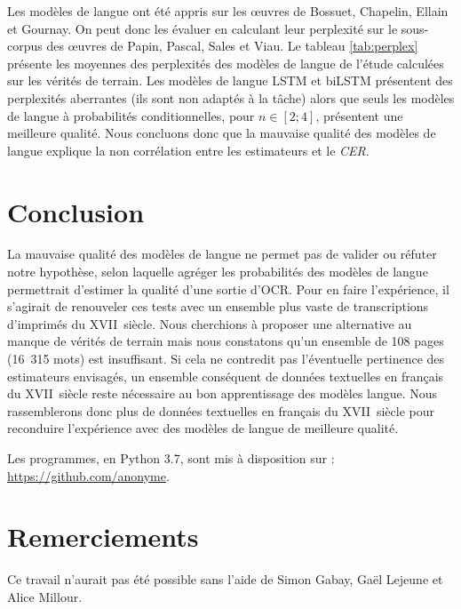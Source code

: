 \documentclass[10pt,twoside]{article}
\begin{document}
    Les modèles de langue ont été appris sur les \oe{}uvres de Bossuet, Chapelin, Ellain et Gournay. On peut donc les
    évaluer en calculant leur perplexité sur le sous-corpus des \oe{}uvres de Papin, Pascal, Sales et Viau. 
    Le tableau \ref{tab:perplex} présente les moyennes des perplexités des modèles de langue
    de l'étude calculées sur les vérités de terrain. Les modèles de langue LSTM et biLSTM 
    présentent des perplexités aberrantes (ils sont non adaptés à la tâche) alors que seuls les modèles de langue à probabilités conditionnelles, pour $n \in \left[2;4\right]$,
    présentent une meilleure qualité. Nous concluons donc que la mauvaise qualité des modèles de langue
    explique la non corrélation entre les estimateurs et le \textit{CER}.



    


\section{Conclusion}
La mauvaise qualité des modèles de langue ne permet pas de valider ou réfuter notre hypothèse, selon laquelle agréger les 
probabilités des modèles de langue permettrait d'estimer la qualité d'une sortie d'OCR. Pour en faire l'expérience, il s'agirait 
de renouveler ces tests avec un ensemble plus vaste de transcriptions d'imprimés du XVII\ieme~siècle. Nous cherchions à proposer une 
alternative au manque de vérités de terrain mais nous constatons qu'un ensemble de 108 pages (16~315 mots) est insuffisant. 
Si cela ne contredit pas l'éventuelle pertinence des estimateurs envisagés, un ensemble conséquent de données textuelles en français du 
XVII\ieme~siècle reste nécessaire au bon apprentissage des modèles langue. Nous rassemblerons donc plus de données textuelles en 
français du XVII\ieme~siècle pour reconduire l'expérience avec des modèles de langue de meilleure qualité. 


Les programmes, en Python 3.7, sont mis à disposition sur : \url{https://github.com/anonyme}.

\section*{Remerciements}
Ce travail n'aurait pas été possible sans l'aide de Simon Gabay, Gaël Lejeune et Alice Millour.  



\nocite{Wick2018a, Springmann2016b, BergKirkpatrick2014a,Breuel2013a,Vamvakas2008a}



\end{document}
